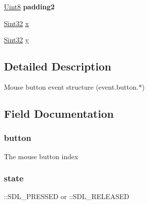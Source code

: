 \begin{DoxyCompactItemize}
\item 
\hyperlink{_s_d_l__stdinc_8h_a2944638813a090aa23e62f4da842c3e2}{Uint8} {\bfseries padding2}\hypertarget{struct_s_d_l___mouse_button_event_a09e3169fff93f108fc1dab93014eb1fb}{}\label{struct_s_d_l___mouse_button_event_a09e3169fff93f108fc1dab93014eb1fb}

\item 
\hyperlink{_s_d_l__stdinc_8h_a7a90b941db9d4582e9ad7abb9940ff7e}{Sint32} \hyperlink{struct_s_d_l___mouse_button_event_a133a64253d58ecff038d427c70b5b0aa}{x}
\item 
\hyperlink{_s_d_l__stdinc_8h_a7a90b941db9d4582e9ad7abb9940ff7e}{Sint32} \hyperlink{struct_s_d_l___mouse_button_event_ae6c55103b58b9a5b746ae4f6fbc9c901}{y}
\end{DoxyCompactItemize}


\subsection{Detailed Description}
Mouse button event structure (event.\+button.$\ast$) 

\subsection{Field Documentation}
\subsubsection[{\texorpdfstring{button}{button}}]{ button}\hypertarget{struct_s_d_l___mouse_button_event_a63c1d3c03e676c0ea5864dc6d0b0082c}{}\label{struct_s_d_l___mouse_button_event_a63c1d3c03e676c0ea5864dc6d0b0082c}
The mouse button index 
\subsubsection[{\texorpdfstring{state}{state}}]{ state}\hypertarget{struct_s_d_l___mouse_button_event_a6b8d8e916bc56265a3fd279bd26b6d1b}{}\label{struct_s_d_l___mouse_button_event_a6b8d8e916bc56265a3fd279bd26b6d1b}
\+::\+S\+D\+L\+\_\+\+P\+R\+E\+S\+S\+ED or \+::\+S\+D\+L\+\_\+\+R\+E\+L\+E\+A\+S\+ED 
